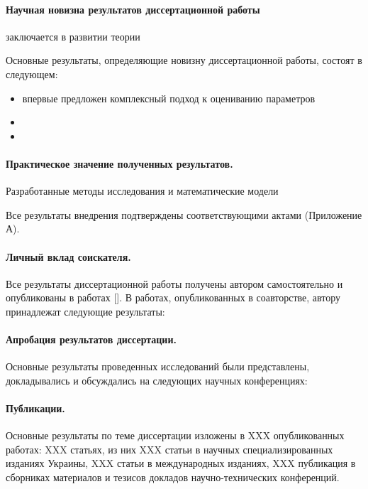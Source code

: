 \paragraph{Научная новизна результатов диссертационной работы} заключается в
развитии теории 

Основные результаты, определяющие новизну диссертационной работы,
состоят в следующем:

\begin{itemize}

\item
  впервые предложен комплексный подход к оцениванию параметров

\item

\item

\end{itemize}


\paragraph{Практическое значение полученных результатов.}
Разработанные методы исследования и математические модели

Все результаты внедрения подтверждены соответствующими актами
(Приложение А).

\paragraph{Личный вклад соискателя.} Все результаты диссертационной работы
получены автором самостоятельно и опубликованы в работах [].
В работах, опубликованных в соавторстве, автору
принадлежат следующие результаты:


\paragraph{Апробация результатов диссертации.}
Основные результаты проведенных исследований были представлены, докладывались и
обсуждались на следующих научных конференциях:

\paragraph{Публикации.}
Основные результаты по теме диссертации изложены в XXX
опубликованных работах: XXX статьях, из них XXX статьи в научных
специализированных изданиях Украины, XXX статьи в международных изданиях,
XXX публикация в сборниках материалов и тезисов докладов научно-технических
конференций.



